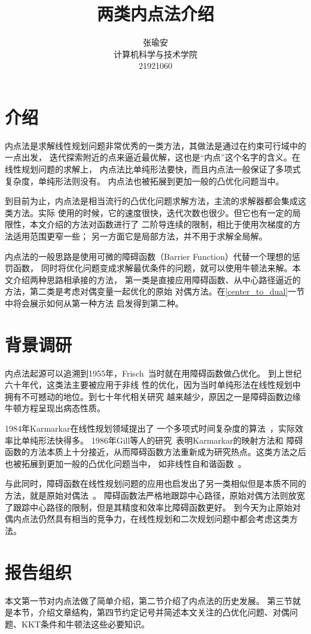 \documentclass{article}
\title{两类内点法介绍}
\author{张瑜安\\ 计算机科学与技术学院 \\21921060}
\date{}
\begin{document}
\maketitle
\section{介绍}
内点法是求解线性规划问题非常优秀的一类方法，其做法是通过在约束可行域中的一点出发，
迭代探索附近的点来逼近最优解，这也是“内点”这个名字的含义。在线性规划问题的求解上，
内点法比单纯形法要快，而且内点法一般保证了多项式复杂度，单纯形法则没有。
内点法也被拓展到更加一般的凸优化问题当中。

到目前为止，内点法是相当流行的凸优化问题求解方法，主流的求解器都会集成这类方法。实际
使用的时候，它的速度很快，迭代次数也很少。但它也有一定的局限性，本文介绍的方法对函数进行了
二阶导连续的限制，相比于使用次梯度的方法适用范围更窄一些；
另一方面它是局部方法，并不用于求解全局解。

内点法的一般思路是使用可微的障碍函数（Barrier Function）代替一个理想的惩罚函数，
同时将优化问题变成求解最优条件的问题，就可以使用牛顿法来解。本文介绍两种思路相承接的方法，
第一类是直接应用障碍函数、从中心路径逼近的方法，第二类是考虑对偶变量一起优化的原始
对偶方法。在\ref{center_to_dual}一节中将会展示如何从第一种方法
启发得到第二种。


\section{背景调研}
内点法起源可以追溯到1955年，Frisch~\cite{frisch1955logarithmic}当时就在用障碍函数做凸优化。
到上世纪六十年代，这类法主要被应用于非线
性的优化，因为当时单纯形法在线性规划中拥有不可撼动的地位。到七十年代相关研究
越来越少，原因之一是障碍函数边缘牛顿方程呈现出病态性质。

1984年Karmarkar在线性规划领域提出了
一个多项式时间复杂度的算法~\cite{karmarkar1984new}，实际效率比单纯形法快得多。
1986年Gill等人的研究~\cite{gill1986projected}表明Karmarkar的映射方法和
障碍函数的方法本质上十分接近，从而障碍函数方法重新成为研究热点。这类方法之后也被拓展到更加一般的凸优化问题当中，
如非线性自和谐函数~\cite{nesterov1994interior}。

与此同时，障碍函数在线性规划问题的应用也启发出了另一类相似但是本质不同的方法，就是原始对偶法~\cite{wright1997primal}。
障碍函数法严格地跟踪中心路径，原始对偶方法则放宽了跟踪中心路径的限制，但是其精度和效率比障碍函数更好。
到今天为止原始对偶内点法仍然具有相当的竞争力，在线性规划和二次规划问题中都会考虑这类方法。


\section{报告组织}
本文第一节对内点法做了简单介绍，第二节介绍了内点法的历史发展。
第三节就是本节，介绍文章结构，第四节约定记号并简述本文关注的凸优化问题、对偶问题、KKT条件和牛顿法这些必要知识。
\end{document}
